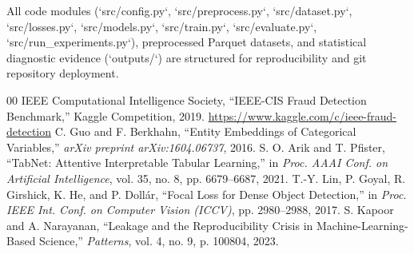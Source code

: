 \documentclass[conference]{IEEEtran}
\begin{document}
All code modules (`src/config.py`, `src/preprocess.py`, `src/dataset.py`, `src/losses.py`, `src/models.py`, `src/train.py`, `src/evaluate.py`, `src/run_experiments.py`), preprocessed Parquet datasets, and statistical diagnostic evidence (`outputs/`) are structured for reproducibility and git repository deployment.

\begin{thebibliography}{00}
 IEEE Computational Intelligence Society, ``IEEE-CIS Fraud Detection Benchmark,'' Kaggle Competition, 2019. \url{https://www.kaggle.com/c/ieee-fraud-detection}
 C. Guo and F. Berkhahn, ``Entity Embeddings of Categorical Variables,'' \textit{arXiv preprint arXiv:1604.06737}, 2016.
 S. O. Arik and T. Pfister, ``TabNet: Attentive Interpretable Tabular Learning,'' in \textit{Proc. AAAI Conf. on Artificial Intelligence}, vol. 35, no. 8, pp. 6679--6687, 2021.
 T.-Y. Lin, P. Goyal, R. Girshick, K. He, and P. Dollár, ``Focal Loss for Dense Object Detection,'' in \textit{Proc. IEEE Int. Conf. on Computer Vision (ICCV)}, pp. 2980--2988, 2017.
 S. Kapoor and A. Narayanan, ``Leakage and the Reproducibility Crisis in Machine-Learning-Based Science,'' \textit{Patterns}, vol. 4, no. 9, p. 100804, 2023.
\end{thebibliography}
\end{document}
